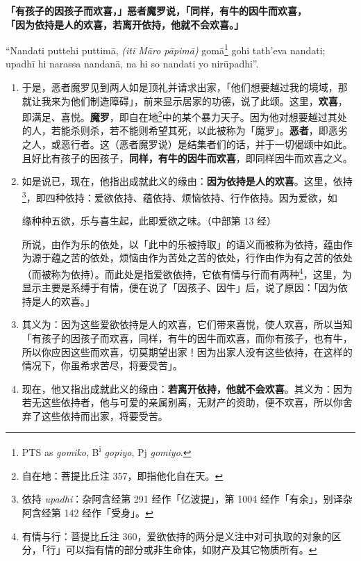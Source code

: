 \textbf{「有孩子的因孩子而欢喜，」恶者魔罗说，「同样，有牛的因牛而欢喜，\\}
\textbf{「因为依持是人的欢喜，若离开依持，他就不会欢喜。」}

“Nandati puttehi puttimā, \textit{(iti Māro pāpimā)} gomā\footnote{PTS as \textit{gomiko}, B\textsuperscript{i} \textit{gopiyo}, Pj \textit{gomiyo}.} gohi tath’eva nandati;\\
upadhī hi narassa nandanā, na hi so nandati yo nirūpadhi”. %

\begin{enumerate}\item 于是，恶者魔罗见到两人如是顶礼并请求出家，「他们想要越过我的境域，那就让我来为他们制造障碍」，前来显示居家的功德，说了此颂。这里，\textbf{欢喜}，即满足、喜悦。\textbf{魔罗}，即自在地\footnote{自在地：菩提比丘注 357，即指他化自在天。}中的某个暴力天子。因为他对想要越过其处的人，若能杀则杀，若不能则希望其死，以此被称为「魔罗」。\textbf{恶者}，即恶劣之人，或恶行者。这（恶者魔罗说）是结集者们的话，并于一切偈颂中如此。且好比有孩子的因孩子，\textbf{同样，有牛的因牛而欢喜}，即同样因牛而欢喜之义。
\item 如是说已，现在，他指出成就此义的缘由：\textbf{因为依持是人的欢喜}。这里，依持\footnote{依持 \textit{upadhi}：杂阿含经第 291 经作「亿波提」，第 1004 经作「有余」，别译杂阿含经第 142 经作「受身」。}，即四种依持：爱欲依持、蕴依持、烦恼依持、行作依持。因为爱欲，如\begin{quoting}缘种种五欲，乐与喜生起，此即爱欲之味。（中部第 13 经）\end{quoting}所说，由作为乐的依处，以「此中的乐被持取」的语义而被称为依持，蕴由作为源于蕴之苦的依处，烦恼由作为苦处之苦的依处，行作由作为有之苦的依处（而被称为依持）。而此处是指爱欲依持，它依有情与行而有两种\footnote{有情与行：菩提比丘注 360，爱欲依持的两分是义注中对可执取的对象的区分，「行」可以指有情的部分或非生命体，如财产及其它物质所有。}，这里，为显示主要是系缚于有情，便在说了「因孩子、因牛」后，说了原因：「因为依持是人的欢喜。」
\item 其义为：因为这些爱欲依持是人的欢喜，它们带来喜悦，使人欢喜，所以当知「有孩子的因孩子而欢喜，同样，有牛的因牛而欢喜，而你有孩子，也有牛，所以你应因这些而欢喜，切莫期望出家！因为出家人没有这些依持，在这样的情况下，你虽希求苦尽，将要受苦」。
\item 现在，他又指出成就此义的缘由：\textbf{若离开依持，他就不会欢喜}。其义为：因为若无这些依持者，他与可爱的亲属别离，无财产的资助，便不欢喜，所以你舍弃了这些依持而出家，将要受苦。\end{enumerate}

